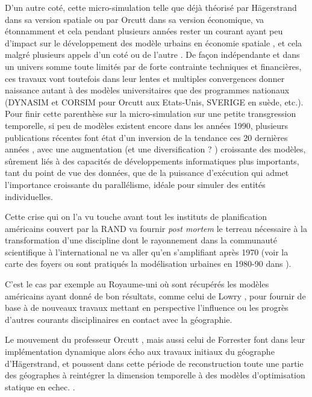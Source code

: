D'un autre coté, cette micro-simulation telle que déjà théorisé par Hägerstrand dans sa version spatiale ou par Orcutt dans sa version économique, va étonnamment et cela pendant plusieurs années rester un courant ayant peu d'impact sur le développement des modèle urbains en économie spatiale \autocite[5]{Sanders2006}, et cela malgré plusieurs appels d'un coté \autocite{Hagerstrand1970} ou de l'autre \autocite[5]{Isard1998}. De façon indépendante et dans un univers somme toute limités par de forte contrainte techniques et financières, ces travaux vont toutefois dans leur lentes et multiples convergences donner naissance autant à des modèles universitaires que des programmes nationaux (DYNASIM et CORSIM pour Orcutt aux Etats-Unis, SVERIGE en suède, etc.). Pour finir cette parenthèse sur la micro-simulation sur une petite transgression temporelle, si peu de modèles existent encore dans les années 1990, plusieurs publications récentes font état d'un inversion de la tendance ces 20 dernières années \autocite{Lenormand2013}, avec une augmentation (et une diversification ? ) croissante des modèles, sûrement liés à des capacités de développements informatiques plus importants, tant du point de vue des données, que de la puissance d’exécution qui admet l'importance croissante du parallélisme, idéale pour simuler des entités individuelles. \autocite[5]{Sanders2006} \autocite{Lenormand2013}

Cette crise qui on l'a vu touche avant tout les instituts de planification américains couvert par la RAND va fournir \textit{post mortem} le terreau nécessaire à la transformation d'une discipline dont le rayonnement dans la communauté scientifique à l'international ne va aller qu'en s'amplifiant après 1970 (voir la carte des foyers ou sont pratiqués la modélisation urbaines en 1980-90 dans \autocite{Wegener1994}).

C'est le cas par exemple au Royaume-uni où sont récupérés les modèles américains ayant donné de bon résultats, comme celui de Lowry \autocite{Lowry1964}, pour fournir de base à de nouveaux travaux mettant en perspective l'influence ou les progrès d'autres courants disciplinaires en contact avec la géographie. 

Le mouvement du professeur Orcutt \autocite{Orcutt1957}, mais aussi celui de Forrester \autocite{Forrester1961, Forrester1969} font dans leur implémentation dynamique alors écho aux travaux initiaux du géographe d'Hägerstrand, et poussent dans cette période de reconstruction toute une partie des géographes à reintégrer la dimension temporelle à des modèles d'optimisation statique en echec. \autocite[p295]{Batty1976}.

